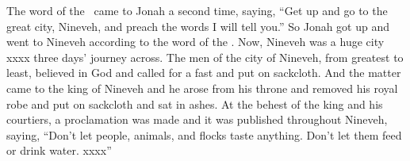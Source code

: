 
\begin{inparaenum}
   The word of the \lord\ came to Jonah a second time, saying,%
   ``Get up and go to the great city, Nineveh, and preach the words I will tell you.''%
   So Jonah got up and went to Nineveh according to the word of the \lord. Now, Nineveh was a huge city xxxx three days' journey across.\understood%
   The men of the city of Nineveh, from greatest to least, believed in God and called for a fast and put on sackcloth.%
   And the matter came to the king of Nineveh and he arose from his throne and removed his royal robe and put on sackcloth and sat in ashes.%
   At the behest of the king and his courtiers, a proclamation was made and it was published throughout Nineveh, saying, ``Don't let people, animals, and flocks taste anything. Don't let them feed or drink water.%
   xxxx''%
\end{inparaenum}
